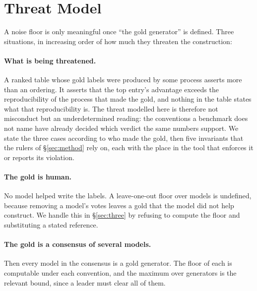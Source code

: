 \documentclass{article}
\begin{document}
\section{Threat Model}
\label{sec:threat} A noise floor is only meaningful once ``the gold generator'' is defined. Three situations, in increasing order of how much they threaten the construction:

\paragraph{What is being threatened.} A ranked table whose gold labels were produced by some process asserts more than an ordering. It asserts that the top entry's advantage exceeds the reproducibility of the process that made the gold, and nothing in the table states what that reproducibility is. The threat modelled here is therefore not misconduct but an underdetermined reading: the conventions a benchmark does not name have already decided which verdict the same numbers support. We state the three cases according to who made the gold, then five invariants that the rulers of \S\ref{sec:method} rely on, each with the place in the tool that enforces it or reports its violation.
\paragraph{The gold is human.} No model helped write the labels. A leave-one-out floor over models is undefined, because removing a model's votes leaves a gold that the model did not help construct. We handle this in \S\ref{sec:three} by refusing to compute the floor and substituting a stated reference.
\paragraph{The gold is a consensus of several models.} Then every model in the consensus is a gold generator. The floor of each is computable under each convention, and the maximum over generators is the relevant bound, since a leader must clear all of them.
\end{document}
